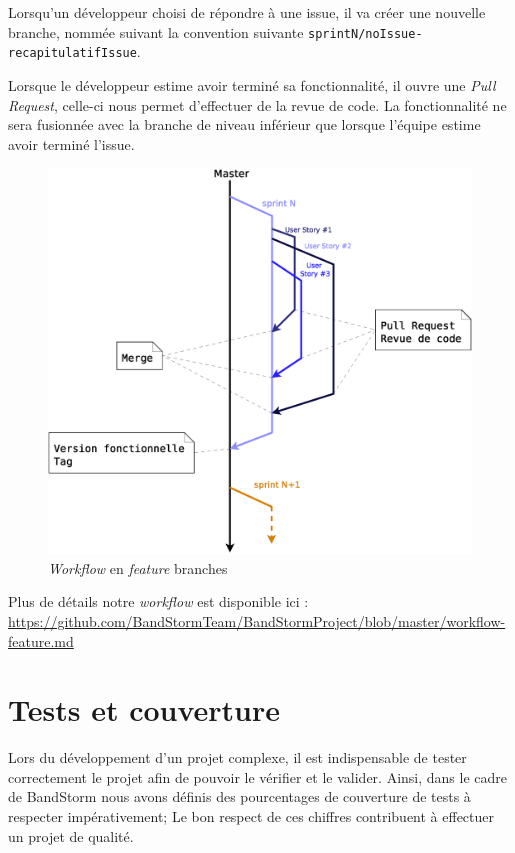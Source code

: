 \documentclass[12pt,a4paper,oneside]{book}
\begin{document}
	Lorsqu'un développeur choisi de répondre à une issue, il va créer une nouvelle branche, nommée suivant la convention suivante
	\texttt{sprintN/noIssue-recapitulatifIssue}.
	
	Lorsque le développeur estime avoir terminé sa fonctionnalité, il ouvre une \textit{Pull Request}, celle-ci nous permet d'effectuer de la revue de code. La fonctionnalité ne sera fusionnée avec la branche de niveau inférieur que lorsque l'équipe estime avoir terminé l'issue.
	\begin{figure}[H]
		\includegraphics[width=15.5cm]{../beamer/images/Process/BranchingWorkflow.eps}
		\caption{\textit{Workflow} en \textit{feature} branches}
	\end{figure}
	Plus de détails notre \textit{workflow} est disponible ici
	: \newline
	\url{https://github.com/BandStormTeam/BandStormProject/blob/master/workflow-feature.md}
	
	\section{Tests et couverture}
	Lors du développement d'un projet complexe, il est indispensable de tester correctement le projet afin de pouvoir le vérifier et le valider. Ainsi, dans le cadre de BandStorm nous avons définis des pourcentages de couverture de tests à respecter impérativement; Le bon respect de ces chiffres contribuent à effectuer un projet de qualité. 
	
\end{document}
